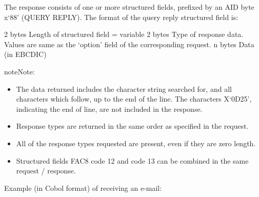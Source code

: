 \documentclass[letterpaper,10pt,english]{sphinxmanual}
\begin{document}

The response consists of one or more structured fields, prefixed by an AID byte x‘88’ (QUERY REPLY). The format of the
query reply structured field is:

\begin{sphinxVerbatim}[commandchars=\\\{\}]
\PYGZhy{} 2 bytes Length of structured field = variable
\PYGZhy{} 2 bytes Type of response data.
Values are same as the ‘option’ field of the corresponding request.
\PYGZhy{} n bytes Data (in EBCDIC)
\end{sphinxVerbatim}


\begin{sphinxadmonition}{note}{Note:}\begin{itemize}
\item {} 
The data returned includes the character string searched for, and all characters which follow, up to the end of the line. The characters X‘0D25’, indicating the end of line, are not included in the response.

\item {} 
Response types are returned in the same order as specified in the request.

\item {} 
All of the response types requested are present, even if they are zero length.

\item {} 
Structured fields FAC8 code 12 and code 13 can be combined in the same request / response.

\end{itemize}
\end{sphinxadmonition}


Example (in Cobol format) of receiving an e-mail:
\end{document}
